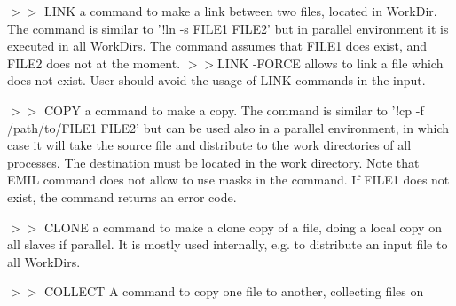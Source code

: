 \begin{commandlist}
\item[$>>$ LINK ]  a command to make a link between two files, located in WorkDir. The command is similar to
'!ln -s FILE1 FILE2' but in parallel environment it is executed in all WorkDirs. The command assumes that
FILE1 does exist, and FILE2 does not at the moment. $>>$LINK -FORCE allows
to link a file which does not exist. User should avoid the usage of LINK commands in the input.
\item[$>>$ COPY ] a command to make a copy.  The command is similar to '!cp -f
  /path/to/FILE1 FILE2' but can be used also in a parallel environment, in which case it
  will take the source file and distribute to the work directories of all
  processes.  The destination must be located in the work directory.  Note that
  EMIL command does not allow to use masks in the command. If FILE1 does not
 exist, the command returns an error code.
\item[$>>$ CLONE ] a command to make a clone copy of a file, doing a local copy on
all slaves if parallel. It is mostly used internally, e.g. to distribute an input
file to all WorkDirs.
\item[$>>$ COLLECT ] A command to copy one file to another, collecting files on

\end{commandlist}
